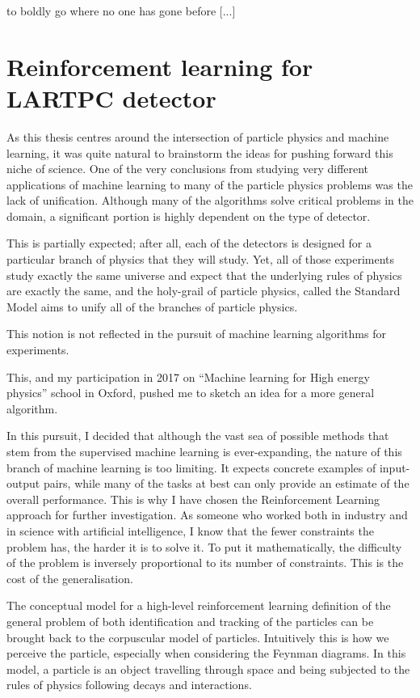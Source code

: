 \begin{savequote}[75mm]
[...] to boldly go where no one has gone before [...]
\end{savequote}

\chapter{Reinforcement learning for LARTPC detector}
\label{chap:rl-lartpc}

As this thesis centres around the intersection of particle physics and machine learning, it was quite natural to brainstorm the ideas for pushing forward this niche of science.
One of the very conclusions from studying very different applications of machine learning to many of the particle physics problems was the lack of unification.
Although many of the algorithms solve critical problems in the domain, a significant portion is highly dependent on the type of detector.

This is partially expected; after all, each of the detectors is designed for a particular branch of physics that they will study. Yet, all of those experiments study exactly the same universe and expect that the underlying rules of physics are exactly the same, and the holy-grail of particle physics, called the Standard Model aims to unify all of the branches of particle physics.

This notion is not reflected in the pursuit of machine learning algorithms for experiments.

This, and my participation in 2017 on ``Machine learning for High energy physics'' school in Oxford, pushed me to sketch an idea for a more general algorithm.

In this pursuit, I decided that although the vast sea of possible methods that stem from the supervised machine learning is ever-expanding, the nature of this branch of machine learning is too limiting.
It expects concrete examples of input-output pairs, while many of the tasks at best can only provide an estimate of the overall performance.
This is why I have chosen the Reinforcement Learning approach for further investigation.
As someone who worked both in industry and in science with artificial intelligence, I know that the fewer constraints the problem has, the harder it is to solve it. To put it mathematically, the difficulty of the problem is inversely proportional to its number of constraints. This is the cost of the generalisation.

The conceptual model for a high-level reinforcement learning definition of the general problem of both identification and tracking of the particles can be brought back to the corpuscular model of particles.
Intuitively this is how we perceive the particle, especially when considering the Feynman diagrams. In this model, a particle is an object travelling through space and being subjected to the rules of physics following decays and interactions.

